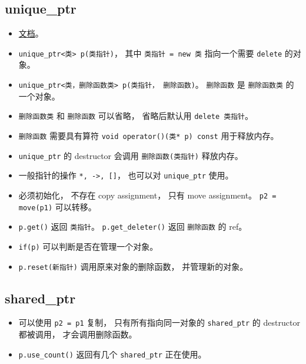 
\begin{issues}
\issueDraft
\end{issues}

\subsection{unique\_ptr}
\begin{itemize}
\item \href{https://en.cppreference.com/w/cpp/memory/unique_ptr}{文档}。
\item \verb`unique_ptr<类> p(类指针)`， 其中 \verb`类指针 = new 类` 指向一个需要 \verb`delete` 的对象。
\item \verb`unique_ptr<类，删除函数类> p(类指针， 删除函数)`。 \verb`删除函数` 是 \verb`删除函数类` 的一个对象。
\item \verb`删除函数类` 和 \verb`删除函数` 可以省略， 省略后默认用 \verb`delete 类指针`。
\item \verb`删除函数` 需要具有算符 \verb`void operator()(类* p) const` 用于释放内存。
\item \verb`unique_ptr` 的 destructor 会调用 \verb`删除函数(类指针)` 释放内存。
\item 一般指针的操作 \verb`*, ->, []`， 也可以对 \verb`unique_ptr` 使用。
\item 必须初始化， 不存在 copy assignment， 只有 move assignment。 \verb`p2 = move(p1)` 可以转移。
\item \verb`p.get()` 返回 \verb`类指针`。 \verb`p.get_deleter()` 返回 \verb`删除函数` 的 ref。
\item \verb`if(p)` 可以判断是否在管理一个对象。
\item \verb`p.reset(新指针)` 调用原来对象的删除函数， 并管理新的对象。
\end{itemize}

\subsection{shared\_ptr}
\begin{itemize}
\item 可以使用 \verb`p2 = p1` 复制， 只有所有指向同一对象的 \verb`shared_ptr` 的 destructor 都被调用， 才会调用删除函数。
\item \verb`p.use_count()` 返回有几个 \verb`shared_ptr` 正在使用。
\end{itemize}

